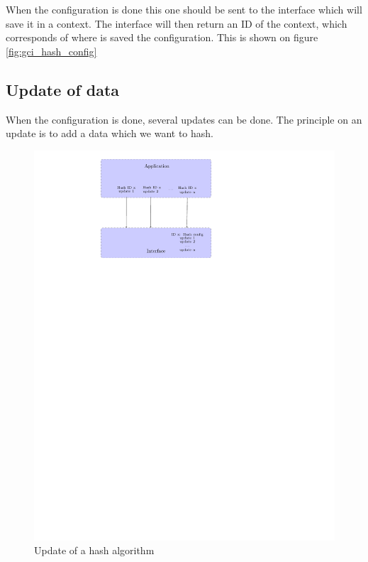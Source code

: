 When the configuration is done this one should be sent to the interface which
will save it in a context.
The interface will then return an ID of the context, which corresponds of
where is saved the configuration.
This is shown on figure \ref{fig:gci_hash_config} 

\subsection*{Update of data}

When the configuration is done, several updates can be done.
The principle on an update is to add a data which we want to hash.

\begin{figure}[!ht]
\centering
\includegraphics[trim=8cm 20cm 12cm 0cm]{figures/hash_example_update.pdf}
\caption{Update of a hash algorithm}
\label{fig:gci_hash_update}
\end{figure}

